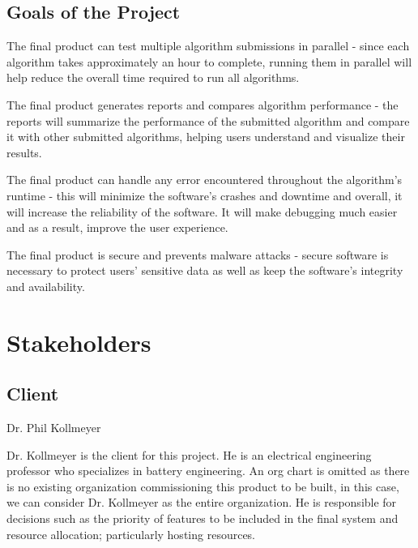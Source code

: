 \documentclass[12pt]{article}
\begin{document}
\subsection{Goals of the Project}

    The final product can test multiple algorithm submissions in parallel - since each algorithm takes approximately an hour to complete, running them in parallel will help reduce the overall time required to run all algorithms.
    
    The final product generates reports and compares algorithm performance - the reports will summarize the performance of the submitted algorithm and compare it with other submitted algorithms, helping users understand and visualize their results.
    
    The final product can handle any error encountered throughout the algorithm’s runtime - this will minimize the software’s crashes and downtime and overall, it will increase the reliability of the software. It will make debugging much easier and as a result, improve the user experience.
    
    The final product is secure and prevents malware attacks - secure software is necessary to protect users’ sensitive data as well as keep the software’s integrity and availability.

\section{Stakeholders}
\subsection{Client}
Dr. Phil Kollmeyer

Dr. Kollmeyer is the client for this project. He is an electrical engineering professor who specializes in battery engineering. An org chart is omitted as there is no existing organization commissioning this product to be built, in this case, we can consider Dr. Kollmeyer as the entire organization. He is responsible for decisions such as the priority of features to be included in the final system and resource allocation; particularly hosting resources.
\end{document}

